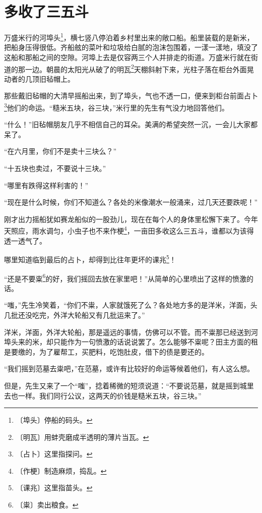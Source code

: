 \documentclass[12pt,UTF-8,openany]{ctexbook}
\begin{document}
\chapter{多收了三五斗}

\begin{large}
    
    万盛米行的河埠头\footnote{〔埠头〕停船的码头。}，横七竖八停泊着乡村里出来的敞口船。船里装载的是新米，把船身压得很低。齐船舷的菜叶和垃圾给白腻的泡沫包围着，一漾一漾地，填没了这船和那船之间的空隙。河埠上去是仅容两三个人并排走的街道。万盛米行就在街道的那一边。朝晨的太阳光从破了的明瓦\footnote{〔明瓦〕用蚌壳磨成半透明的薄片当瓦。}天棚斜射下来，光柱子落在柜台外面晃动者的几顶旧毡帽上。
    
    那些戴旧毡帽的大清早摇船出来，到了埠头，气也不透一口，便来到柜台前面占卜\footnote{〔占卜〕这里指探问。}他们的命运。“糙米五块，谷三块，”米行里的先生有气没力地回答他们。
    
    “什么！”旧毡帽朋友几乎不相信自己的耳朵。美满的希望突然一沉，一会儿大家都呆了。
    
    “在六月里，你们不是卖十三块么？”
    
    “十五块也卖过，不要说十三块。”
    
    “哪里有跌得这样利害的！”
    
    “现在是什么时候，你们不知道么？各处的米像潮水一般涌来，过几天还要跌呢！”
    
    刚才出力摇船犹如赛龙船似的一股劲儿，现在在每个人的身体里松懈下来了。今年天照应，雨水调匀，小虫子也不来作梗\footnote{〔作梗〕制造麻烦，捣乱。}，一亩田多收这么三五斗，谁都以为该得透一透气了。
    
    哪里知道临到最后的占卜，却得到比往年更坏的课兆\footnote{〔课兆〕这里指苗头。}！
    
    “还是不要粜\footnote{〔粜〕卖出粮食。}的好，我们摇回去放在家里吧！”从简单的心里喷出了这样的愤激的话。
    
    “嗤，”先生冷笑着，“你们不粜，人家就饿死了么？各处地方多的是洋米，洋面，头几批还没吃完，外洋大轮船又有几批运来了。”
    
    洋米，洋面，外洋大轮船，那是遥远的事情，仿佛可以不管。而不粜那已经送到河埠头来的米，却只能作为一句愤激的话说说罢了。怎么能够不粜呢？田主方面的租是要缴的，为了雇帮工，买肥料，吃饱肚皮，借下的债是要还的。
    
    “我们摇到范墓去粜吧，”在范墓，或许有比较好的命运等候着他们，有人这么想。
    
    但是，先生又来了一个“嗤”，捻着稀微的短须说道：“不要说范墓，就是摇到城里去也一样。我们同行公议，这两天的价钱是糙米五块，谷三块。”
    

\end{large}
\end{document}
